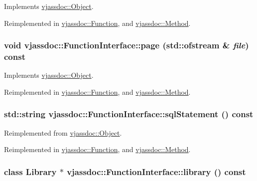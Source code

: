 Implements \hyperlink{classvjassdoc_1_1Object_736bbb6719edd8070d8f56c364a2764c}{vjassdoc::Object}.

Reimplemented in \hyperlink{classvjassdoc_1_1Function_b0776a1e111d7fcefbbcecd92f210a48}{vjassdoc::Function}, and \hyperlink{classvjassdoc_1_1Method_d5d61124a7d28d7e4680cc0df6cc5deb}{vjassdoc::Method}.\hypertarget{classvjassdoc_1_1FunctionInterface_3f5c67bb77822e08047b327f244ec364}{
\subsubsection{\setlength{\rightskip}{0pt plus 5cm}void vjassdoc::FunctionInterface::page (std::ofstream \& {\em file}) const}}
\label{classvjassdoc_1_1FunctionInterface_3f5c67bb77822e08047b327f244ec364}




Implements \hyperlink{classvjassdoc_1_1Object_a0489e38956f3507566b1bc6e3e2c8af}{vjassdoc::Object}.

Reimplemented in \hyperlink{classvjassdoc_1_1Function_7f32865b4c3f9f4c4e6379a437f5bdfe}{vjassdoc::Function}, and \hyperlink{classvjassdoc_1_1Method_564b24f8b05185ac9399dd36a9b0ad1a}{vjassdoc::Method}.\hypertarget{classvjassdoc_1_1FunctionInterface_20b33401bc90587128da6bae1c6986d8}{
\subsubsection{\setlength{\rightskip}{0pt plus 5cm}std::string vjassdoc::FunctionInterface::sqlStatement () const}}
\label{classvjassdoc_1_1FunctionInterface_20b33401bc90587128da6bae1c6986d8}




Reimplemented from \hyperlink{classvjassdoc_1_1Object_4e8ebbb0ce5b0bf91ec847b1e4a9f8fc}{vjassdoc::Object}.

Reimplemented in \hyperlink{classvjassdoc_1_1Function_7e4a84e1bb86ade42e6a95d81d8092a7}{vjassdoc::Function}, and \hyperlink{classvjassdoc_1_1Method_0a9c4b3b9cb2043eb1454ae72bbfe04f}{vjassdoc::Method}.\hypertarget{classvjassdoc_1_1FunctionInterface_c9519495c94b07101fa5e0739775759e}{
\subsubsection{\setlength{\rightskip}{0pt plus 5cm}class {\bf Library} $\ast$ vjassdoc::FunctionInterface::library () const}}
\label{classvjassdoc_1_1FunctionInterface_c9519495c94b07101fa5e0739775759e}




